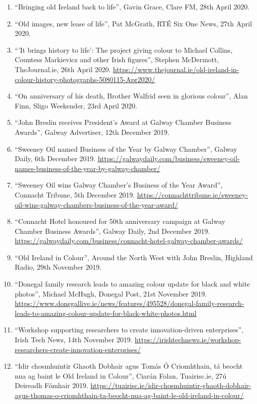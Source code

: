 \documentclass[10pt,a4paper]{res} %
\begin{document}
\begin{resume}
{\begin{enumerate}
\item ``Bringing old Ireland back to life'', Gavin Grace, Clare FM, 28th April 2020.
\item ``Old images, new lease of life'', Pat McGrath, RT\'{E} Six One News, 27th April 2020.
\item ``'It brings history to life': The project giving colour to Michael Collins, Countess Markievicz and other Irish figures'', Stephen McDermott, TheJournal.ie, 26th April 2020. \url{https://www.thejournal.ie/old-ireland-in-colour-history-photographs-5080115-Apr2020/}
\item ``On anniversary of his death, Brother Walfrid seen in glorious colour'', Alan Finn, Sligo Weekender, 23rd April 2020.
\item ``John Breslin receives President's Award at Galway Chamber Business Awards'', Galway Advertiser, 12th December 2019.
\item ``Sweeney Oil named Business of the Year by Galway Chamber'', Galway Daily, 6th December 2019. \url{https://galwaydaily.com/business/sweeney-oil-names-business-of-the-year-by-galway-chamber/}
\item ``Sweeney Oil wins Galway Chamber's Business of the Year Award'', Connacht Tribune, 5th December 2019. \url{https://connachttribune.ie/sweeney-oil-wins-galway-chambers-business-of-the-year-award/}
\item ``Connacht Hotel honoured for 50th anniversary campaign at Galway Chamber Business Awards'', Galway Daily, 2nd December 2019. \url{https://galwaydaily.com/business/connacht-hotel-galway-chamber-awards/}
\item ``Old Ireland in Colour'', Around the North West with John Breslin, Highland Radio, 29th November 2019.
\item ``Donegal family research leads to amazing colour update for black and white photos'', Michael McHugh, Donegal Post, 21st November 2019. \url{https://www.donegallive.ie/news/features/495528/donegal-family-research-leads-to-amazing-colour-update-for-black-white-photos.html}
\item ``Workshop supporting researchers to create innovation-driven enterprises'', Irish Tech News, 14th November 2019. \url{https://irishtechnews.ie/workshop-researchers-create-innovation-enterprises/}
\item ``Idir chosmhuintir Ghaoth Dobhair agus Tom\'{a}s \'{O} Criomhthain, t\'{a} beocht nua ag baint le Old Ireland in Colour'', Ciar\'{a}n Folan, Tuairisc.ie, 27\'{u} Deireadh F\'{o}mhair 2019. \url{https://tuairisc.ie/idir-chosmhuintir-ghaoth-dobhair-agus-thomas-o-criomhthain-ta-beocht-nua-ag-baint-le-old-ireland-in-colour/}

\end{enumerate}}
\end{resume}
\end{document}
